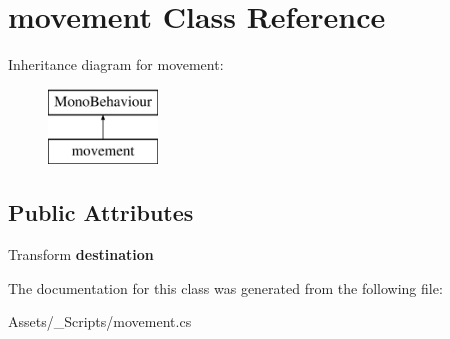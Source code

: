 \hypertarget{classmovement}{}\section{movement Class Reference}
\label{classmovement}
Inheritance diagram for movement\+:\begin{figure}[H]
\begin{center}
\leavevmode
\includegraphics[height=2.000000cm]{classmovement}
\end{center}
\end{figure}
\subsection*{Public Attributes}
\begin{DoxyCompactItemize}
\item 
\hypertarget{classmovement_a853bd1ba34a86d555ebfad0e4bb2f4dd}{}Transform {\bfseries destination}\label{classmovement_a853bd1ba34a86d555ebfad0e4bb2f4dd}

\end{DoxyCompactItemize}


The documentation for this class was generated from the following file\+:\begin{DoxyCompactItemize}
\item 
Assets/\+\_\+\+Scripts/movement.\+cs\end{DoxyCompactItemize}
